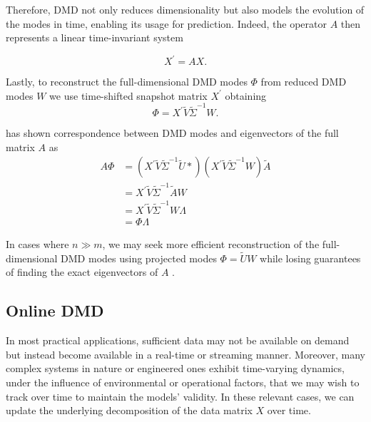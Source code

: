 Therefore, DMD not only reduces dimensionality but also models the evolution of the modes in time, enabling its usage for prediction\citep{Brunton2022}. Indeed, the operator \(A\) then represents a linear time-invariant system

\begin{equation*}
    X^\prime = AX.
\end{equation*}

Lastly, to reconstruct the full-dimensional DMD modes \(\Phi \) from reduced DMD modes \(W\) we use time-shifted snapshot matrix \(X^\prime \) obtaining
\begin{equation}\label{eq:full-dmd-modes}
    \Phi = X^\prime \tilde{V} \tilde{\Sigma}^{-1} W.
\end{equation}

\citet{Tu2013} has shown correspondence between DMD modes and eigenvectors of the full matrix \(A\) as
\begin{align*}
    A\Phi
     & = (X^\prime \tilde{V} \tilde{\Sigma}^{-1} \tilde{U}*) (X^\prime \tilde{V} \tilde{\Sigma}^{-1} W)
    \tilde{A}                                                                                           \\
     & = X^\prime \tilde{V} \tilde{\Sigma}^{-1} \tilde{A} W                                             \\
     & = X^\prime \tilde{V} \tilde{\Sigma}^{-1} W \Lambda                                               \\
     & = \Phi \Lambda
\end{align*}

In cases where \(n \gg m\), we may seek more efficient reconstruction of the full-dimensional DMD modes using projected modes \(\Phi = \tilde{U} W\) while losing guarantees of finding the exact eigenvectors of \(A\) \citep{Schmid2010}.

\subsection{Online DMD}
In most practical applications, sufficient data may not be available on demand but instead become available in a real-time or streaming manner. Moreover, many complex systems in nature or engineered ones exhibit time-varying dynamics, under the influence of environmental or operational factors, that we may wish to track over time to maintain the models' validity. In these relevant cases, we can update the underlying decomposition of the data matrix \(X\) over time.

